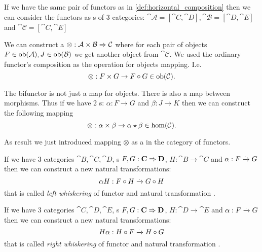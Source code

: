 \begin{remark}
 \label{rem:bifunctor_fun_cat}
If we have the same pair of functors as in
\cref{def:horizontal_composition} then we can consider the functors as
s of 3 categories: $\cat{\mathcal{A}} = \left[\cat{C},
  \cat{D}\right], \cat{\mathcal{B}} = \left[\cat{D},
  \cat{E}\right]$ and $\cat{\mathcal{C}} = \left[\cat{C},
  \cat{E}\right]$ 

  We can construct a  
  $\otimes: \mathbf{\mathcal{A}} \times \mathbf{\mathcal{B}} \Rightarrow \mathbf{\mathcal{C}}$
  where for each pair of objects $F \in \mathrm{ob}(\mathbf{\mathcal{A}}), J \in
  \mathrm{ob}(\mathbf{\mathcal{B}})$ we get another object from $\cat{\mathcal{C}}$.
  We used the ordinary functor's composition as the operation for
  objects mapping.
  I.e.
  \[
  \otimes: F \times G \to F \circ G \in \mathrm{ob}(\mathbf{\mathcal{C}}).
  \]
  
  The bifunctor is not just a map for objects. There is also a map
  between morphisms. Thus if we have 2 s:
  $\alpha : F \to G$ and $\beta : J \to K$ then we can construct the
  following mapping 
  \[
  \otimes: \alpha \times \beta \to \alpha \star \beta \in \mathrm{hom}(\mathbf{\mathcal{C}}).
  \]
  
  As result we just introduced mapping $\otimes$ as a
   in the category of functors.
\end{remark}

\begin{definition}
\label{def:lw}
If we have 3 categories $\cat{B}, \cat{C}, \cat{D}$, 
s $F,G: \mathbf{C} \Rightarrow \mathbf{D}$, $H: \cat{B} \to
\cat{C}$ and  
$\alpha: F \xrightarrow{.} G$ then we can construct a new natural
transformations:
\[
\alpha H : F \circ H \xrightarrow{.} G \circ H
\]
that is called \textit{left whiskering} of functor and natural
transformation \cite{nlab:whiskering}. 
\end{definition}

\begin{definition}
\label{def:rw}
If we have 3 categories $\cat{C}, \cat{D}, \cat{E}$, 
s $F,G: \mathbf{C} \Rightarrow \mathbf{D}$, $H: \cat{D} \to
\cat{E}$ and  
$\alpha: F \xrightarrow{.} G$ then we can construct a new natural 
transformations: 
\[
H \alpha : H \circ F \xrightarrow{.} H \circ G
\]
that is called \textit{right whiskering} of functor and natural
transformation \cite{nlab:whiskering}. 
\end{definition}

